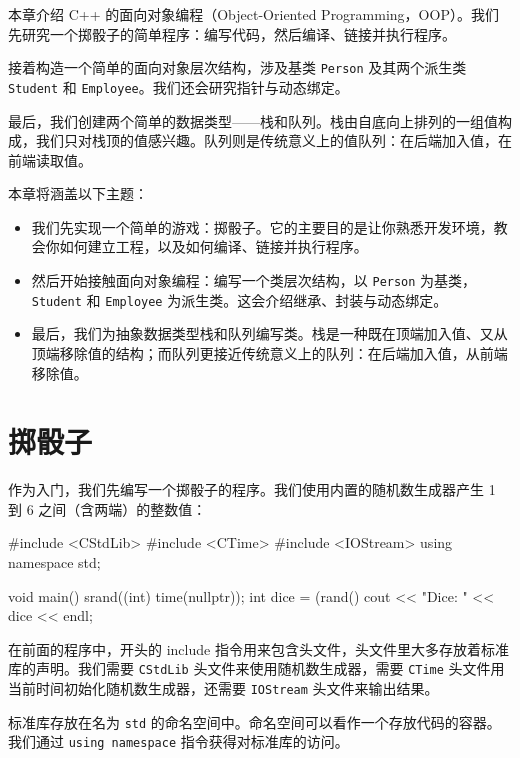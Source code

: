 \renewcommand{\codeInset}{63bp}
本章介绍 C++ 的面向对象编程（Object-Oriented Programming，OOP）。我们先研究一个掷骰子的简单程序：编写代码，然后编译、链接并执行程序。

接着构造一个简单的面向对象层次结构，涉及基类 \texttt{Person} 及其两个派生类 \texttt{Student} 和 \texttt{Employee}。我们还会研究指针与动态绑定。

最后，我们创建两个简单的数据类型——栈和队列。栈由自底向上排列的一组值构成，我们只对栈顶的值感兴趣。队列则是传统意义上的值队列：在后端加入值，在前端读取值。

本章将涵盖以下主题：

\begin{itemize}
\item 我们先实现一个简单的游戏：掷骰子。它的主要目的是让你熟悉开发环境，教会你如何建立工程，以及如何编译、链接并执行程序。
\item 然后开始接触面向对象编程：编写一个类层次结构，以 \texttt{Person} 为基类，\texttt{Student} 和 \texttt{Employee} 为派生类。这会介绍继承、封装与动态绑定。
\item 最后，我们为抽象数据类型栈和队列编写类。栈是一种既在顶端加入值、又从顶端移除值的结构；而队列更接近传统意义上的队列：在后端加入值，从前端移除值。
\end{itemize}

\section{掷骰子}

作为入门，我们先编写一个掷骰子的程序。我们使用内置的随机数生成器产生 1 到 6 之间（含两端）的整数值：

\medskip{}

\begin{codebox}
#include <CStdLib>
#include <CTime>
#include <IOStream>
using namespace std;

void main() {
  srand((int) time(nullptr));
  int dice = (rand() %
  cout << "Dice: " << dice << endl;
}
\end{codebox}

在前面的程序中，开头的 include 指令用来包含头文件，头文件里大多存放着标准库的声明。我们需要 \texttt{CStdLib} 头文件来使用随机数生成器，需要 \texttt{CTime} 头文件用当前时间初始化随机数生成器，还需要 \texttt{IOStream} 头文件来输出结果。

标准库存放在名为 \texttt{std} 的命名空间中。命名空间可以看作一个存放代码的容器。我们通过 \texttt{using namespace} 指令获得对标准库的访问。

